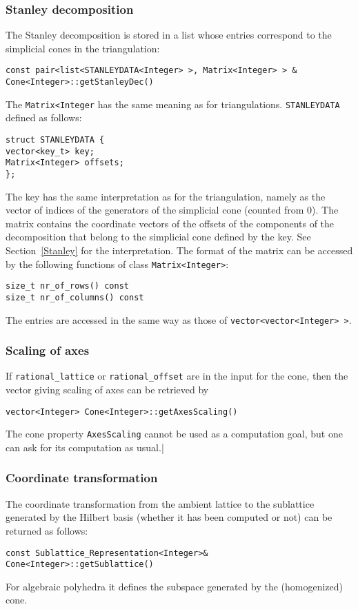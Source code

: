 \begin{small}
\subsubsection{Stanley decomposition}

The Stanley decomposition is stored in a list whose entries correspond to the simplicial cones in the triangulation:
\begin{Verbatim}
const pair<list<STANLEYDATA<Integer> >, Matrix<Integer> > &  Cone<Integer>::getStanleyDec()
\end{Verbatim}
The \verb|Matrix<Integer| has the same meaning as for triangulations.
\verb|STANLEYDATA| defined as follows:
\begin{Verbatim}
struct STANLEYDATA {
vector<key_t> key;
Matrix<Integer> offsets;
};
\end{Verbatim}
The key has the same interpretation as for the triangulation, namely as the vector of indices of the generators of the simplicial cone (counted from $0$). The matrix contains the coordinate vectors of the offsets of the components of the decomposition that belong to the simplicial cone defined by the key. See Section~\ref{Stanley} for the interpretation. The format of the matrix can be accessed by the following functions of class \verb|Matrix<Integer>|:
\begin{Verbatim}
size_t nr_of_rows() const
size_t nr_of_columns() const
\end{Verbatim}
The entries are accessed in the same way as those of \verb|vector<vector<Integer> >|.

\subsubsection{Scaling of axes}

If \verb|rational_lattice| or \verb|rational_offset| are in the input for the cone, then the vector giving scaling of axes can be retrieved by
\begin{Verbatim}
vector<Integer> Cone<Integer>::getAxesScaling() 
\end{Verbatim}
The cone property \verb|AxesScaling| cannot be used as a computation goal, but one can ask for its computation as usual.|

\subsubsection{Coordinate transformation}\label{coord}

The coordinate transformation from the ambient lattice to the sublattice generated by the Hilbert basis (whether it has been computed or not) can be returned as follows:
\begin{Verbatim}
const Sublattice_Representation<Integer>& Cone<Integer>::getSublattice()
\end{Verbatim}
For algebraic polyhedra it defines the subspace generated by the (homogenized) cone.


\end{small}
